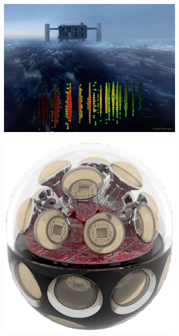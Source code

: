 \documentclass[a4paper,11pt]{article}
\begin{document}

\begin{figure}
    \begin{subfigure}[c]{0.65\textwidth}
    \centering
    \includegraphics[width=0.9\linewidth]{images/IceCube_1200x.jpg}
    \caption{\label{fig:icecube}}
    \end{subfigure}
    \begin{subfigure}[c]{0.35\textwidth}
    \centering
    \includegraphics[width=0.9\linewidth]{images/mdom.jpg}

\end{subfigure}
\end{figure}
\end{document}
